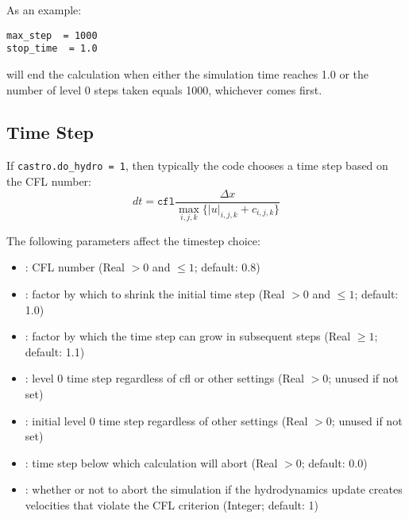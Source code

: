 As an example: 
\begin{lstlisting}
max_step  = 1000
stop_time  = 1.0
\end{lstlisting}
will end the calculation when either the simulation time reaches 1.0 or 
the number of level 0 steps taken equals 1000, whichever comes first.


\subsection{Time Step}
If {\tt castro.do\_hydro = 1}, then typically 
the code chooses a time step based on the CFL number:
\begin{equation}
dt = \mathtt{cfl} \frac{\Delta x}{\max_{i,j,k}\{|u|_{i,j,k}+c_{i,j,k}\}}
\label{eq:cfl}
\end{equation}

The following parameters affect the timestep choice:
\begin{itemize}
\item {}: CFL number (Real $> 0$ and $\leq 1$;
  default: 0.8)

\item {}: factor by which to shrink the initial
   time step (Real $> 0$ and $\leq 1$; default: 1.0)

\item {}: factor by which the time step can
  grow in subsequent steps (Real $\geq 1$; default: 1.1)

\item {}: level 0 time step regardless of cfl
  or other settings (Real $> 0$; unused if not set)

\item {}: initial level 0 time
   step regardless of other settings (Real $> 0$;  unused if not set)

\item {}: time step below which calculation
  will abort (Real $> 0$; default: 0.0)

\item {}: whether or not to abort the
  simulation if the hydrodynamics update creates velocities that
  violate the CFL criterion (Integer; default: 1)
\end{itemize}

